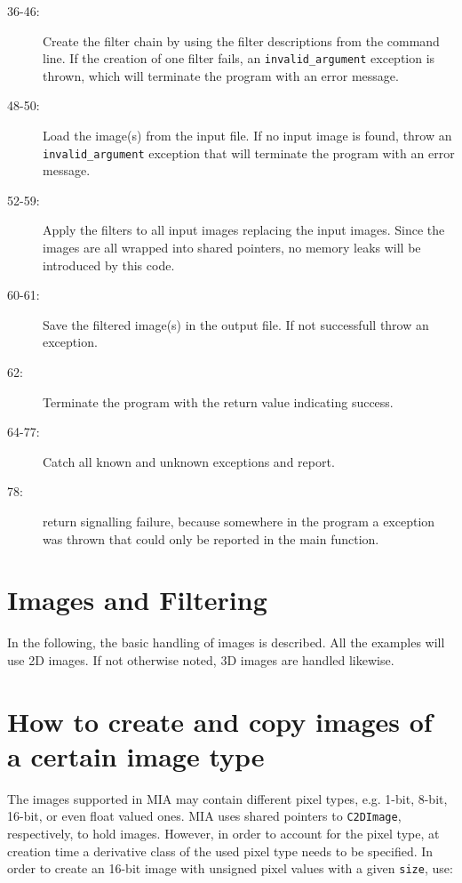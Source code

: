 \documentclass[english, 10pt, a4paper,headsepline,openany]{scrbook}
\begin{document}
\begin{description}
\item [36-46:] Create the filter chain by using the filter descriptions from the command line. 
       If the creation of one filter fails, an \texttt{invalid\_argument} exception is thrown, which will terminate the 
       program with an error message. 
\item [48-50:] Load the image(s) from the input file. 
       If no input image is found, throw an \texttt{invalid\_argument} exception that will terminate the program with an error message. 
\item [52-59:] Apply the filters to all input images replacing the input images. 
       Since the images are all wrapped into shared pointers, no memory leaks will be introduced by this code. 
\item [60-61:] Save the filtered image(s) in the output file. If not successfull throw an exception.
\item [62:] Terminate the program with the return value indicating success.
\item [64-77:] Catch all known and unknown exceptions and report.
\item [78:] return signalling failure, because somewhere in the program a exception was thrown that could only be reported 
    in the main function. 
\end{description}

\section{Images and Filtering}

\label{ch:images}

In the following, the basic handling of images is described. 
All the examples will use 2D images. 
If not otherwise noted, 3D images are handled likewise. 

\section{How to create and copy images of a certain image type}

The images supported in MIA  may contain different pixel types, e.g. 1-bit, 8-bit, 16-bit, or even float valued ones. 
MIA uses shared pointers to \texttt{C2DImage}, respectively,  to hold images. 
However, in order to account for the pixel type, at creation time a derivative class of the used pixel type needs to be specified. 
In order to create an 16-bit image with unsigned pixel values with a given \texttt{size}, use:
\end{document}
